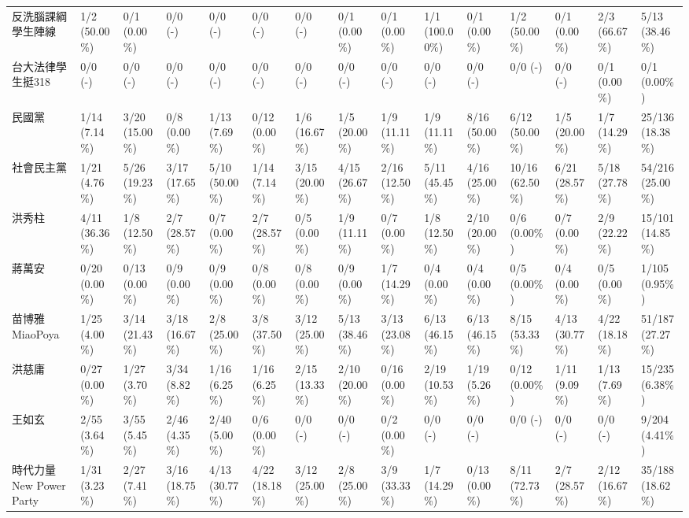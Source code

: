 \documentclass[letterpaper, 10pt, conference]{ieeeconf}   %
\begin{document}
\begin{CJK}{UTF8}{bsmi}
\begin{landscape}
\begin{longtable}[c]{@{}L{2.45cm}L{1.1cm}L{1.1cm}L{1.1cm}L{1.1cm}L{1.1cm}L{1.1cm}L{1.1cm}L{1.1cm}L{1.1cm}L{1.1cm}L{1.1cm}L{1.1cm}L{1.1cm}L{1.1cm}@{}}
反洗腦課綱學生陣線 & 1/2 (50.00\%) & 0/1 (0.00\%) & 0/0 (-) & 0/0 (-) & 0/0 (-) & 0/0 (-) & 0/1 (0.00\%) & 0/1 (0.00\%) & 1/1 (100.00\%) & 0/1 (0.00\%) & 1/2 (50.00\%) & 0/1 (0.00\%) & 2/3 (66.67\%) & 5/13 (38.46\%) \\
台大法律學生挺318 & 0/0 (-) & 0/0 (-) & 0/0 (-) & 0/0 (-) & 0/0 (-) & 0/0 (-) & 0/0 (-) & 0/0 (-) & 0/0 (-) & 0/0 (-) & 0/0 (-) & 0/0 (-) & 0/1 (0.00\%) & 0/1 (0.00\%) \\
民國黨 & 1/14 (7.14\%) & 3/20 (15.00\%) & 0/8 (0.00\%) & 1/13 (7.69\%) & 0/12 (0.00\%) & 1/6 (16.67\%) & 1/5 (20.00\%) & 1/9 (11.11\%) & 1/9 (11.11\%) & 8/16 (50.00\%) & 6/12 (50.00\%) & 1/5 (20.00\%) & 1/7 (14.29\%) & 25/136 (18.38\%) \\
社會民主黨 & 1/21 (4.76\%) & 5/26 (19.23\%) & 3/17 (17.65\%) & 5/10 (50.00\%) & 1/14 (7.14\%) & 3/15 (20.00\%) & 4/15 (26.67\%) & 2/16 (12.50\%) & 5/11 (45.45\%) & 4/16 (25.00\%) & 10/16 (62.50\%) & 6/21 (28.57\%) & 5/18 (27.78\%) & 54/216 (25.00\%) \\
洪秀柱 & 4/11 (36.36\%) & 1/8 (12.50\%) & 2/7 (28.57\%) & 0/7 (0.00\%) & 2/7 (28.57\%) & 0/5 (0.00\%) & 1/9 (11.11\%) & 0/7 (0.00\%) & 1/8 (12.50\%) & 2/10 (20.00\%) & 0/6 (0.00\%) & 0/7 (0.00\%) & 2/9 (22.22\%) & 15/101 (14.85\%) \\
蔣萬安 & 0/20 (0.00\%) & 0/13 (0.00\%) & 0/9 (0.00\%) & 0/9 (0.00\%) & 0/8 (0.00\%) & 0/8 (0.00\%) & 0/9 (0.00\%) & 1/7 (14.29\%) & 0/4 (0.00\%) & 0/4 (0.00\%) & 0/5 (0.00\%) & 0/4 (0.00\%) & 0/5 (0.00\%) & 1/105 (0.95\%) \\
苗博雅 MiaoPoya & 1/25 (4.00\%) & 3/14 (21.43\%) & 3/18 (16.67\%) & 2/8 (25.00\%) & 3/8 (37.50\%) & 3/12 (25.00\%) & 5/13 (38.46\%) & 3/13 (23.08\%) & 6/13 (46.15\%) & 6/13 (46.15\%) & 8/15 (53.33\%) & 4/13 (30.77\%) & 4/22 (18.18\%) & 51/187 (27.27\%) \\
洪慈庸 & 0/27 (0.00\%) & 1/27 (3.70\%) & 3/34 (8.82\%) & 1/16 (6.25\%) & 1/16 (6.25\%) & 2/15 (13.33\%) & 2/10 (20.00\%) & 0/16 (0.00\%) & 2/19 (10.53\%) & 1/19 (5.26\%) & 0/12 (0.00\%) & 1/11 (9.09\%) & 1/13 (7.69\%) & 15/235 (6.38\%) \\
王如玄 & 2/55 (3.64\%) & 3/55 (5.45\%) & 2/46 (4.35\%) & 2/40 (5.00\%) & 0/6 (0.00\%) & 0/0 (-) & 0/0 (-) & 0/2 (0.00\%) & 0/0 (-) & 0/0 (-) & 0/0 (-) & 0/0 (-) & 0/0 (-) & 9/204 (4.41\%) \\
時代力量 New Power Party & 1/31 (3.23\%) & 2/27 (7.41\%) & 3/16 (18.75\%) & 4/13 (30.77\%) & 4/22 (18.18\%) & 3/12 (25.00\%) & 2/8 (25.00\%) & 3/9 (33.33\%) & 1/7 (14.29\%) & 0/13 (0.00\%) & 8/11 (72.73\%) & 2/7 (28.57\%) & 2/12 (16.67\%) & 35/188 (18.62\%) \\

\end{longtable}
\end{landscape}
\end{CJK}
\end{document}
